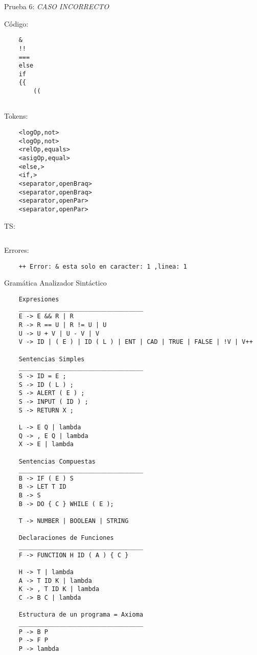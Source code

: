 \documentclass{article}
\begin{document}
Prueba 6: \textit{CASO INCORRECTO}%
\begin{flushleft}
Código:
\begin{verbatim}
    &
    !!
    ===
    else
    if
    {{
        ((
               
\end{verbatim}

Tokens:
\begin{verbatim}
    <logOp,not>
    <logOp,not>
    <relOp,equals>
    <asigOp,equal>
    <else,>
    <if,>
    <separator,openBraq>
    <separator,openBraq>
    <separator,openPar>
    <separator,openPar>
\end{verbatim}
    TS:
\begin{verbatim}

\end{verbatim}
Errores:
\begin{verbatim}
    ++ Error: & esta solo en caracter: 1 ,linea: 1
\end{verbatim}
\end{flushleft}
\vspace{3cm}
\newpage
Gramática Analizador Sintáctico
\begin{verbatim}
    Expresiones
    __________________________________
    E -> E && R | R
    R -> R == U | R != U | U
    U -> U + V | U - V | V
    V -> ID | ( E ) | ID ( L ) | ENT | CAD | TRUE | FALSE | !V | V++
    
    Sentencias Simples
    __________________________________
    S -> ID = E ;
    S -> ID ( L ) ;
    S -> ALERT ( E ) ;
    S -> INPUT ( ID ) ;
    S -> RETURN X ;
    
    L -> E Q | lambda
    Q -> , E Q | lambda
    X -> E | lambda
    
    Sentencias Compuestas
    __________________________________
    B -> IF ( E ) S
    B -> LET T ID
    B -> S
    B -> DO { C } WHILE ( E );
    
    T -> NUMBER | BOOLEAN | STRING
    
    Declaraciones de Funciones
    __________________________________
    F -> FUNCTION H ID ( A ) { C }
    
    H -> T | lambda
    A -> T ID K | lambda
    K -> , T ID K | lambda
    C -> B C | lambda

    Estructura de un programa = Axioma
    __________________________________
    P -> B P 
    P -> F P
    P -> lambda

\end{verbatim}
\end{document}
